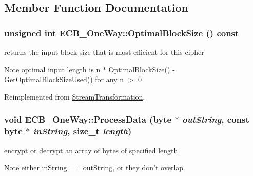 \subsection{Member Function Documentation}
\hypertarget{class_e_c_b___one_way_ae525b1874f11cd0aa85f2d93c17f9d08}{
\subsubsection[{OptimalBlockSize}]{\setlength{\rightskip}{0pt plus 5cm}unsigned int ECB\_\-OneWay::OptimalBlockSize () const}}
\label{class_e_c_b___one_way_ae525b1874f11cd0aa85f2d93c17f9d08}


returns the input block size that is most efficient for this cipher \begin{DoxyNote}{Note}
optimal input length is n $\ast$ \hyperlink{class_e_c_b___one_way_ae525b1874f11cd0aa85f2d93c17f9d08}{OptimalBlockSize()} -\/ \hyperlink{class_stream_transformation_a94b4e1d14edde1fdde38361bce9ca4c6}{GetOptimalBlockSizeUsed()} for any n $>$ 0 
\end{DoxyNote}


Reimplemented from \hyperlink{class_stream_transformation_ae79457bcbafc980672d88ee54ed4ac66}{StreamTransformation}.\hypertarget{class_e_c_b___one_way_a4d8c291d821d86f7f4caa3cf95d1834c}{
\subsubsection[{ProcessData}]{\setlength{\rightskip}{0pt plus 5cm}void ECB\_\-OneWay::ProcessData (byte $\ast$ {\em outString}, \/  const byte $\ast$ {\em inString}, \/  size\_\-t {\em length})}}
\label{class_e_c_b___one_way_a4d8c291d821d86f7f4caa3cf95d1834c}


encrypt or decrypt an array of bytes of specified length \begin{DoxyNote}{Note}
either inString == outString, or they don't overlap 
\end{DoxyNote}


